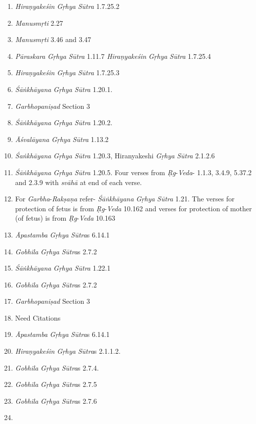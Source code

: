 \begin{enumerate}
\item
  \emph{Hiraṇyakeśin} \emph{Gṛhya} \emph{Sūtra} 1.7.25.2
\item
  \emph{Manusmṛti} 2.27
\item
  \emph{Manusmṛti} 3.46 and 3.47
\item
  \emph{Pāraskara} \emph{Gṛhya} \emph{Sūtra} 1.11.7 \emph{Hiraṇyakeśin} \emph{Gṛhya} \emph{Sūtra} 1.7.25.4
\item
  \emph{Hiraṇyakeśin} \emph{Gṛhya} \emph{Sūtra} 1.7.25.3
\item
  \emph{Śāṅkhāyana} \emph{Gṛhya} \emph{Sūtra} 1.20.1.
\item
  \emph{Garbhopaniṣad} Section 3
\item
  \emph{Śāṅkhāyana} \emph{Gṛhya} \emph{Sūtra} 1.20.2.
\item
  \emph{Āśvalāyana} \emph{Gṛhya} \emph{Sūtra} 1.13.2
\item
  \emph{Śaṅkhāyana} \emph{Gṛhya} \emph{Sūtra} 1.20.3, Hiranyakeshi \emph{Gṛhya} \emph{Sūtra} 2.1.2.6
\item
  \emph{Śāṅkhāyana} \emph{Gṛhya} \emph{Sūtra} 1.20.5. Four verses from \emph{Ṛg}-\emph{Veda}- 1.1.3, 3.4.9, 5.37.2 and 2.3.9 with \emph{svāhā} at end of each verse.
\item
  For \emph{Garbha}-\emph{Rakṣaṇa} refer- \emph{Śāṅkhāyana} \emph{Gṛhya} \emph{Sūtra} 1.21. The verses for protection of fetus is from \emph{Ṛg}-\emph{Veda} 10.162 and verses for protection of mother (of fetus) is from \emph{Ṛg}-\emph{Veda} 10.163
\item
  \emph{Āpastamba} \emph{Gṛhya} \emph{Sūtra}s 6.14.1
\item
  \emph{Gobhila} \emph{Gṛhya} \emph{Sūtra}s 2.7.2
\item
  \emph{Śāṅkhāyana} \emph{Gṛhya} \emph{Sūtra} 1.22.1
\item
  \emph{Gobhila} \emph{Gṛhya} \emph{Sūtra}s 2.7.2
\item
  \emph{Garbhopaniṣad} Section 3
\item
  Need Citations
\item
  \emph{Āpastamba} \emph{Gṛhya} \emph{Sūtra}s 6.14.1
\item
  \emph{Hiraṇyakeśin} \emph{Gṛhya} \emph{Sūtra}s 2.1.1.2.
\item
  \emph{Gobhila} \emph{Gṛhya} \emph{Sūtra}s 2.7.4.
\item
  \emph{Gobhila} \emph{Gṛhya} \emph{Sūtra}s 2.7.5
\item
  \emph{Gobhila} \emph{Gṛhya} \emph{Sūtra}s 2.7.6
\item

\end{enumerate}
